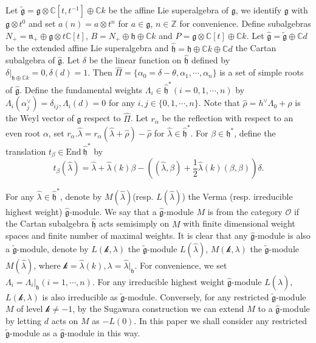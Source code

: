 \documentclass[12pt]{article}
\begin{document}
Let $\widetilde{\mathfrak{g}}=\mathfrak{g}\otimes\mathbb{C}[t,t^{-1}]\oplus\mathbb{C}k$ be the affine Lie superalgebra of $\mathfrak{g}$,
we identify $\mathfrak{g}$ with $\mathfrak{g}\otimes t^0$ and
set $a(n)=a\otimes t^n$ for $a\in\mathfrak{g}$, $n\in\mathbb{Z}$ for convenience.
Define subalgebras
$N_+=\mathfrak{n}_+\oplus\mathfrak{g}\otimes t\mathbb{C}[t]$,
$B=N_+\oplus\mathfrak{h}\oplus\mathbb{C}k$ and $P=\mathfrak{g}\otimes\mathbb{C}[t]\oplus\mathbb{C}k$.
Let $\widehat{\mathfrak{g}}=\widetilde{\mathfrak{g}}\oplus\mathbb{C}d$ be the extended affine Lie superalgebra
and $\widehat{\mathfrak{h}}=\mathfrak{h}\oplus\mathbb{C}k\oplus\mathbb{C}d$ the Cartan subalgebra of $\widehat{\mathfrak{g}}$.
Let $\delta$ be the linear function on $\widehat{\mathfrak{h}}$ defined by $\delta|_{\mathfrak{h}\oplus\mathbb{C}k}=0, \delta(d)=1$.
Then $\widehat{\Pi}=\{\alpha_0=\delta-\theta,\alpha_1,\cdots,\alpha_n\}$ is a set of simple roots of $\widehat{\mathfrak{g}}$.
Define the fundamental weights $\Lambda_i\in \widehat{\mathfrak{h}}^* (i=0,1,\cdots,n)$ by $\Lambda_i(\alpha_j^{\vee})=\delta_{ij}, \Lambda_i(d)=0$ for any $i,j\in\{0,1,\cdots,n\}$.
Note that $\widehat{\rho}=h^{\vee}\Lambda_0+\rho$ is the Weyl vector of $\widehat{\mathfrak{g}}$ respect to $\widehat{\Pi}$.
Let $r_\alpha$ be the reflection with respect to an even root $\alpha$,
set $r_{\alpha}.\hat{\lambda}=r_{\alpha}(\hat{\lambda}+\widehat{\rho})-\widehat{\rho}$ for $\hat{\lambda}\in \widehat{\mathfrak{h}}^*$.
For $\beta\in \mathfrak{h}^*$, define the translation $t_\beta\in \mbox{End}~\widehat{\mathfrak{h}}^*$ by
$$t_\beta(\hat{\lambda})=\hat{\lambda}+\hat{\lambda}(k)\beta-((\hat{\lambda},\beta)+\frac{1}{2}\hat{\lambda}(k)(\beta,\beta))\delta.$$

For any $\hat{\lambda}\in \widehat{\mathfrak{h}}^*$,
denote by $M(\hat{\lambda})$(resp. $L(\hat{\lambda})$) the Verma (resp. irreducible highest weight) $\widehat{\mathfrak{g}}$-module.
We say that a $\widehat{\mathfrak{g}}$-module $M$ is from the category $\mathcal{O}$ if
the Cartan subalgebra $\widehat{\mathfrak{h}}$ acts semisimply on $M$ with finite dimensional weight spaces
and finite number of maximal weights.
It is clear that any $\widehat{\mathfrak{g}}$-module is also a $\widetilde{\mathfrak{g}}$-module,
denote by $L(\mathcal{k},\lambda)$ the $\widetilde{\mathfrak{g}}$-module $L(\hat{\lambda})$, $M(\mathcal{k},\lambda)$ the $\widetilde{\mathfrak{g}}$-module $M(\hat{\lambda})$, where $\mathcal{k}=\hat{\lambda}(k),\lambda=\hat{\lambda}|_{\mathfrak{h}}$.
For convenience, we set $\Lambda_i=\Lambda_i|_{\mathfrak{h}}(i=1,\cdots,n)$.
For any irreducible highest weight $\widehat{\mathfrak{g}}$-module $L(\hat{\lambda})$,
$L(\mathcal{k},\lambda)$ is also irreducible as $\widetilde{\mathfrak{g}}$-module.
Conversely, for any restricted $\widetilde{\mathfrak{g}}$-module $M$ of level $\mathcal{k}\neq-1$,
by the Sugawara construction we can extend $M$ to a $\widehat{\mathfrak{g}}$-module by letting $d$ acts on $M$ as $-L(0)$.
In this paper we shall consider any restricted $\widetilde{\mathfrak{g}}$-module as a $\widehat{\mathfrak{g}}$-module in this way.
\end{document}
